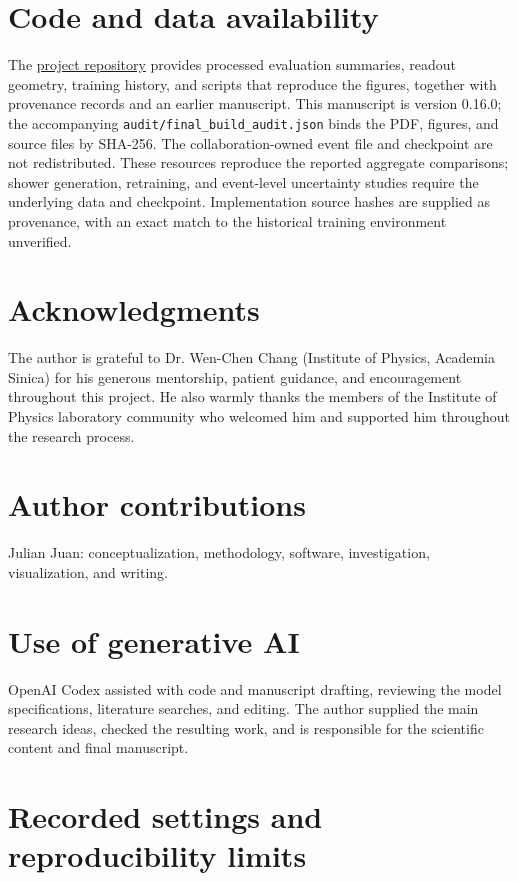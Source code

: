 \documentclass[11pt]{article}
\begin{document}
\section*{Code and data availability}

The \href{https://github.com/JulianAttemptsCoding/fast-mc-paper}{project repository} provides processed evaluation summaries, readout geometry, training history, and scripts that reproduce the figures, together with provenance records and an earlier manuscript. This manuscript is version 0.16.0; the accompanying \texttt{audit/final\_build\_audit.json} binds the PDF, figures, and source files by SHA-256. The collaboration-owned event file and checkpoint are not redistributed. These resources reproduce the reported aggregate comparisons; shower generation, retraining, and event-level uncertainty studies require the underlying data and checkpoint. Implementation source hashes are supplied as provenance, with an exact match to the historical training environment unverified.

\section*{Acknowledgments}

The author is grateful to Dr. Wen-Chen Chang (Institute of Physics, Academia Sinica) for his generous mentorship, patient guidance, and encouragement throughout this project. He also warmly thanks the members of the Institute of Physics laboratory community who welcomed him and supported him throughout the research process.

\section*{Author contributions}

Julian Juan: conceptualization, methodology, software, investigation, visualization, and writing.

\section*{Use of generative AI}

OpenAI Codex assisted with code and manuscript drafting, reviewing the model specifications, literature searches, and editing. The author supplied the main research ideas, checked the resulting work, and is responsible for the scientific content and final manuscript.


\clearpage
\appendix
\section{Recorded settings and reproducibility limits}
\label{app:reproducibility}
\end{document}
